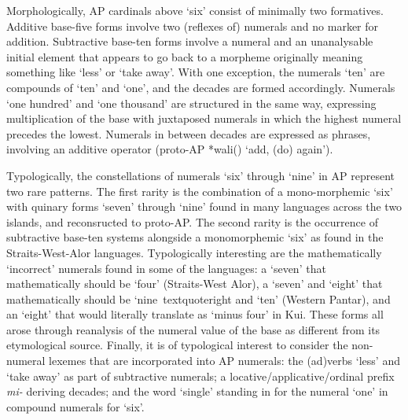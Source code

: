 Morphologically, AP cardinals above {\textquoteleft}six{\textquoteright} consist of minimally two formatives. Additive base-five forms involve two (reflexes of) numerals and no marker for addition. Subtractive base-ten forms involve a numeral and an unanalysable initial element that appears to go back to a morpheme originally meaning something like {\textquoteleft}less{\textquoteright} or {\textquoteleft}take away{\textquoteright}. With one exception, the numerals {\textquoteleft}ten{\textquoteright} are compounds of {\textquoteleft}ten{\textquoteright} and {\textquoteleft}one{\textquoteright}, and the decades are formed accordingly. Numerals {\textquoteleft}one hundred{\textquoteright} and {\textquoteleft}one thousand{\textquoteright} are structured in the same way, expressing multiplication of the base with juxtaposed numerals in which the highest numeral precedes the lowest. Numerals in between decades are expressed as phrases, involving an additive operator (proto-AP *wali({\ng}) {\textquoteleft}add, (do)
 again{\textquoteright}). 

Typologically, the constellations of numerals {\textquoteleft}six{\textquoteright} through {\textquoteleft}nine{\textquoteright} in AP represent two rare patterns. The first rarity is the combination of a mono-morphemic {\textquoteleft}six{\textquoteright} with quinary forms {\textquoteleft}seven{\textquoteright} through {\textquoteleft}nine{\textquoteright} found in many languages across the two islands, and reconsructed to proto-AP. The second rarity is the occurrence of subtractive base-ten systems alongside a monomorphemic {\textquoteleft}six{\textquoteright} as found in the Straits-West-Alor languages. Typologically interesting are the mathematically {\textquoteleft}incorrect{\textquoteright} numerals found in some of the languages: a {\textquoteleft}seven{\textquoteright} that mathematically should be {\textquoteleft}four{\textquoteright} (Straits-West Alor), a {\textquoteleft}seven{\textquoteright} and {\textquoteleft}eight{\textquoteright} that mathematically should be {\textquoteleft}nine{\
textquoteright} and {\textquoteleft}ten{\textquoteright} (Western Pantar), and an {\textquoteleft}eight{\textquoteright} that would literally translate as {\textquoteleft}minus four{\textquoteright} in Kui. These forms all arose through reanalysis of the numeral value of the base as different from its etymological source. Finally, it is of typological interest to consider the non-numeral lexemes that are incorporated into AP numerals: the (ad)verbs {\textquoteleft}less{\textquoteright} and {\textquoteleft}take away{\textquoteright} as part of subtractive numerals; a locative/applicative/ordinal prefix \textit{mi- }deriving decades; and the word {\textquoteleft}single{\textquoteright} standing in for the numeral {\textquoteleft}one{\textquoteright} in compound numerals for {\textquoteleft}six{\textquoteright}. 

